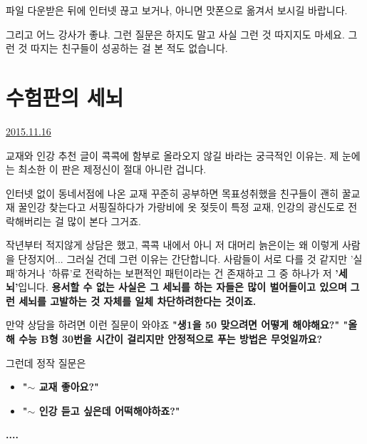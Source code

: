 파일 다운받은 뒤에 인터넷 끊고 보거나, 아니면 맛폰으로 옮겨서 보시길 바랍니다.
\vspace{5mm}

그리고 어느 강사가 좋냐.
그런 질문은 하지도 말고 사실 그런 것 따지지도 마세요.
그런 것 따지는 친구들이 성공하는 걸 본 적도 없습니다.
\vspace{5mm}






\section{수험판의 세뇌}
\href{https://www.kockoc.com/Apoc/491558}{2015.11.16}

\vspace{5mm}

교재와 인강 추천 글이 콕콕에 함부로 올라오지 않길 바라는 궁극적인 이유는.
제 눈에는 최소한 이 판은 제정신이 절대 아니란 겁니다.
\vspace{5mm}

인터넷 없이 동네서점에 나온 교재 꾸준히 공부하면 목표성취했을 친구들이
괜히 꿀교재 꿀인강 찾는다고 서핑질하다가 가랑비에 옷 젖듯이 특정 교재, 인강의 광신도로 전락해버리는 걸 많이 본다 그거죠.
\vspace{5mm}

작년부터 적지않게 상담은 했고, 콕콕 내에서 아니 저 대머리 늙은이는 왜 이렇게 사람을 단정지어... 그러실 건데
그런 이유는 간단합니다. 사람들이 서로 다를 것 같지만 '실패'하거나 '하류'로 전락하는 보편적인 패턴이라는 건 존재하고
그 중 하나가 저 \textbf{'세뇌'}입니다.
\textbf{용서할 수 없는 사실은 그 세뇌를 하는 자들은 많이 벌어들이고 있으며}
\textbf{그런 세뇌를 고발하는 것 자체를 일체 차단하려한다는 것이죠.}
\vspace{5mm}

만약 상담을 하려면 이런 질문이 와야죠
\textbf{"생1을 50 맞으려면 어떻게 해야해요?"    "올해 수능 B형 30번을 시간이 걸리지만 안정적으로 푸는 방법은 무엇일까요?}
\vspace{5mm}

그런데 정작 질문은
\begin{itemize}
    \item[] \textbf{"$\sim$ 교재 좋아요?"}
    \item[] \textbf{"$\sim$ 인강 듣고 싶은데 어떡해야하죠?"}
\end{itemize}
\vspace{5mm}

\textbf{....}
\vspace{5mm}

